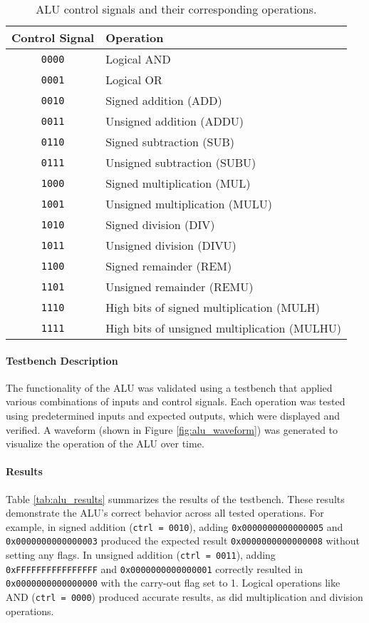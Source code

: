 \documentclass[12pt]{article}
\begin{document}
\begin{table}[ht!]
    \centering
    \renewcommand{\arraystretch}{1.1}
    \setlength{\tabcolsep}{4pt}
    \begin{tabular}{|c|l|}
        \hline
        \textbf{Control Signal} & \textbf{Operation} \\
        \hline
        \texttt{0000} & Logical AND \\
        \texttt{0001} & Logical OR \\
        \texttt{0010} & Signed addition (ADD) \\
        \texttt{0011} & Unsigned addition (ADDU) \\
        \texttt{0110} & Signed subtraction (SUB) \\
        \texttt{0111} & Unsigned subtraction (SUBU) \\
        \texttt{1000} & Signed multiplication (MUL) \\
        \texttt{1001} & Unsigned multiplication (MULU) \\
        \texttt{1010} & Signed division (DIV) \\
        \texttt{1011} & Unsigned division (DIVU) \\
        \texttt{1100} & Signed remainder (REM) \\
        \texttt{1101} & Unsigned remainder (REMU) \\
        \texttt{1110} & High bits of signed multiplication (MULH) \\
        \texttt{1111} & High bits of unsigned multiplication (MULHU) \\
        \hline
    \end{tabular}
    \caption{ALU control signals and their corresponding operations.}
    \label{tab:control_signals}
\end{table}

\paragraph{Testbench Description}
The functionality of the ALU was validated using a testbench that applied various combinations of inputs and control signals. Each operation was tested using predetermined inputs and expected outputs, which were displayed and verified. A waveform (shown in Figure \ref{fig:alu_waveform}) was generated to visualize the operation of the ALU over time.

\paragraph{Results}
Table \ref{tab:alu_results} summarizes the results of the testbench. These results demonstrate the ALU's correct behavior across all tested operations. For example, in signed addition (\texttt{ctrl = 0010}), adding \texttt{0x0000000000000005} and \texttt{0x0000000000000003} produced the expected result \texttt{0x0000000000000008} without setting any flags. In unsigned addition (\texttt{ctrl = 0011}), adding \texttt{0xFFFFFFFFFFFFFFFF} and \texttt{0x0000000000000001} correctly resulted in \texttt{0x0000000000000000} with the carry-out flag set to 1. Logical operations like AND (\texttt{ctrl = 0000}) produced accurate results, as did multiplication and division operations.
\end{document}

